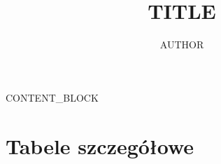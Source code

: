\documentclass{article}
\title{TITLE}
\author{AUTHOR}
\begin{document}
\maketitle

\tableofcontents
\newpage

CONTENT_BLOCK

\section{Tabele szczegółowe}

\listoffigures
\listoftables
\end{document}

